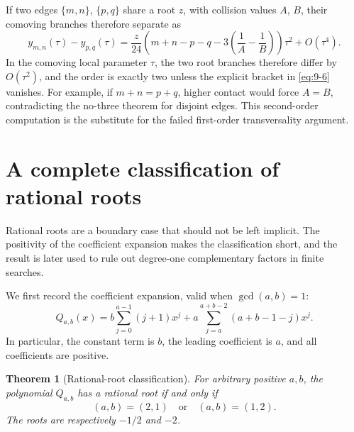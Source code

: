 \documentclass[11pt]{article}
\numberwithin{equation}{section}
\newtheorem{theorem}{Theorem}[section]
\theoremstyle{definition}
\begin{document}
If two edges \(\{m,n\}\), \(\{p,q\}\) share a root \(z\), with collision
values \(A\), \(B\), their comoving branches therefore separate as
\begin{equation}
 y_{m,n}(\tau)-y_{p,q}(\tau)
 =\frac z{24}
 \left(m+n-p-q-3\left(\frac1A-\frac1B\right)\right)\tau^2
 +O(\tau^4).
 \label{eq:9-6}
\end{equation}
In the comoving local parameter \(\tau\), the two root branches therefore
differ by \(O(\tau^2)\), and the order is exactly two unless the explicit
bracket in \eqref{eq:9-6} vanishes.
For example, if \(m+n=p+q\), higher contact would force \(A=B\), contradicting
the no-three theorem for disjoint edges.  This second-order computation is the
substitute for the failed first-order transversality argument.

\section{A complete classification of rational roots}
\label{sec:rational}

Rational roots are a boundary case that should not be left implicit.  The positivity of the coefficient expansion makes the classification short, and the result is later used to rule out degree-one complementary factors in finite searches.

We first record the coefficient expansion, valid when \(\gcd(a,b)=1\):
\begin{equation}
 Q_{a,b}(x)=
 b\sum_{j=0}^{a-1}(j+1)x^j
 +a\sum_{j=a}^{a+b-2}(a+b-1-j)x^j.
 \label{eq:10-1}
\end{equation}
In particular, the constant term is \(b\), the leading coefficient is \(a\),
and all coefficients are positive.

\begin{theorem}[Rational-root classification]\label{thm:rational}
For arbitrary positive \(a,b\), the polynomial \(Q_{a,b}\) has a rational root
if and only if
\[
 (a,b)=(2,1)\quad\text{or}\quad(a,b)=(1,2).
\]
The roots are respectively \(-1/2\) and \(-2\).
\end{theorem}
\end{document}
